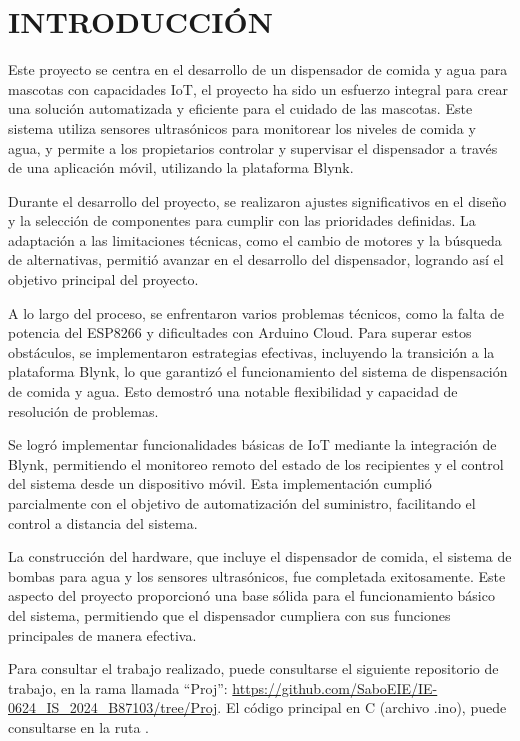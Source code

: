 \newpage
\section{INTRODUCCIÓN}

Este proyecto se centra en el desarrollo de un dispensador de comida y agua para mascotas con capacidades IoT, el proyecto ha sido un esfuerzo integral para crear una solución automatizada y eficiente para el cuidado de las mascotas. Este sistema utiliza sensores ultrasónicos para monitorear los niveles de comida y agua, y permite a los propietarios controlar y supervisar el dispensador a través de una aplicación móvil, utilizando la plataforma Blynk.

Durante el desarrollo del proyecto, se realizaron ajustes significativos en el diseño y la selección de componentes para cumplir con las prioridades definidas. La adaptación a las limitaciones técnicas, como el cambio de motores y la búsqueda de alternativas, permitió avanzar en el desarrollo del dispensador, logrando así el objetivo principal del proyecto.

A lo largo del proceso, se enfrentaron varios problemas técnicos, como la falta de potencia del ESP8266 y dificultades con Arduino Cloud. Para superar estos obstáculos, se implementaron estrategias efectivas, incluyendo la transición a la plataforma Blynk, lo que garantizó el funcionamiento del sistema de dispensación de comida y agua. Esto demostró una notable flexibilidad y capacidad de resolución de problemas.

Se logró implementar funcionalidades básicas de IoT mediante la integración de Blynk, permitiendo el monitoreo remoto del estado de los recipientes y el control del sistema desde un dispositivo móvil. Esta implementación cumplió parcialmente con el objetivo de automatización del suministro, facilitando el control a distancia del sistema.

La construcción del hardware, que incluye el dispensador de comida, el sistema de bombas para agua y los sensores ultrasónicos, fue completada exitosamente. Este aspecto del proyecto proporcionó una base sólida para el funcionamiento básico del sistema, permitiendo que el dispensador cumpliera con sus funciones principales de manera efectiva.

Para consultar el trabajo realizado, puede consultarse el siguiente repositorio de trabajo, en la rama llamada ``Proj'': \url{https://github.com/SaboEIE/IE-0624_IS_2024_B87103/tree/Proj}. El código principal en C (archivo .ino), puede consultarse en la ruta . 

